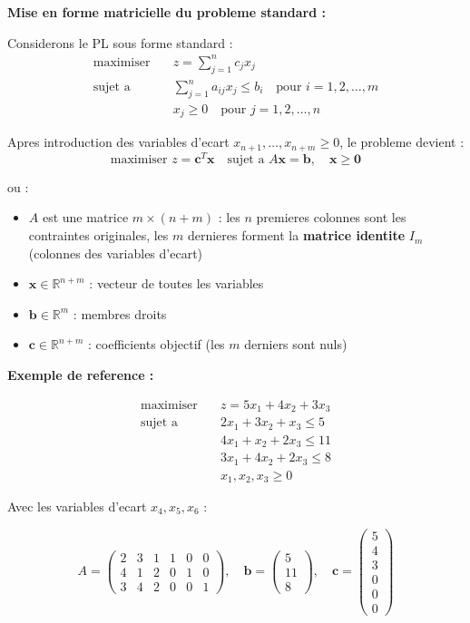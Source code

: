 \documentclass[12pt,a4paper]{article}
\begin{document}
\begin{methode}
\textbf{Mise en forme matricielle du probleme standard :}

Considerons le PL sous forme standard :
\begin{align*}
\text{maximiser} \quad & z = \sum_{j=1}^{n} c_j x_j\\
\text{sujet a} \quad & \sum_{j=1}^{n} a_{ij} x_j \leq b_i \quad \text{pour } i = 1, 2, \ldots, m\\
& x_j \geq 0 \quad \text{pour } j = 1, 2, \ldots, n
\end{align*}

Apres introduction des variables d'ecart $x_{n+1}, \ldots, x_{n+m} \geq 0$, le probleme devient :
$$\text{maximiser } z = \mathbf{c}^T \mathbf{x} \quad \text{sujet a } A\mathbf{x} = \mathbf{b}, \quad \mathbf{x} \geq \mathbf{0}$$

ou :
\begin{itemize}
    \item $A$ est une matrice $m \times (n+m)$ : les $n$ premieres colonnes sont les contraintes originales, les $m$ dernieres forment la \textcolor{defvert}{\textbf{matrice identite}} $I_m$ (colonnes des variables d'ecart)
    \item $\mathbf{x} \in \mathbb{R}^{n+m}$ : vecteur de toutes les variables
    \item $\mathbf{b} \in \mathbb{R}^m$ : membres droits
    \item $\mathbf{c} \in \mathbb{R}^{n+m}$ : coefficients objectif (les $m$ derniers sont nuls)
\end{itemize}
\end{methode}

\begin{exemple}
\textbf{Exemple de reference :}

\begin{align*}
\text{maximiser} \quad & z = 5x_1 + 4x_2 + 3x_3\\
\text{sujet a} \quad & 2x_1 + 3x_2 + x_3 \leq 5\\
& 4x_1 + x_2 + 2x_3 \leq 11\\
& 3x_1 + 4x_2 + 2x_3 \leq 8\\
& x_1, x_2, x_3 \geq 0
\end{align*}

Avec les variables d'ecart $x_4, x_5, x_6$ :

$$A = \begin{pmatrix} 2 & 3 & 1 & 1 & 0 & 0 \\ 4 & 1 & 2 & 0 & 1 & 0 \\ 3 & 4 & 2 & 0 & 0 & 1 \end{pmatrix}, \quad \mathbf{b} = \begin{pmatrix} 5 \\ 11 \\ 8 \end{pmatrix}, \quad \mathbf{c} = \begin{pmatrix} 5 \\ 4 \\ 3 \\ 0 \\ 0 \\ 0 \end{pmatrix}$$
\end{exemple}
\end{document}
